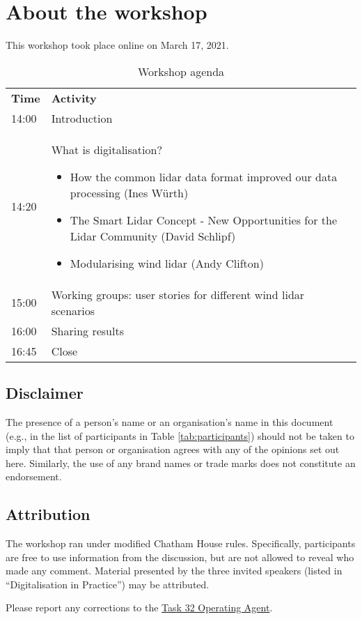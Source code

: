 \section{About the workshop}
This workshop took place online on March 17, 2021.

\begin{table}[!h]
 \centering
 \begin{tabular}{@{}|p{}|p{}|@{}}
 \rowcolor{Task32Blue2} \textbf{Time} & \textbf{Activity} \\
 14:00 & Introduction \\
 14:20 & What is digitalisation?
  \begin{itemize}
        \item How the common lidar data format improved our data processing (Ines Würth)
        \item The Smart Lidar Concept - New Opportunities for the Lidar Community (David Schlipf)
	\item Modularising wind lidar (Andy Clifton)
    \end{itemize} \\
 15:00 & Working groups: user stories for different wind lidar scenarios\\
 16:00 & Sharing results\\
 16:45 & Close \\
 \end{tabular}
 \caption{Workshop agenda}
 \label{tab:agenda}
\end{table}

\subsection*{Disclaimer}
The presence of a person’s name or an organisation's name in this document (e.g., in the list of participants in Table \ref{tab:participants}) should not be taken to imply that that person or organisation agrees with any of the opinions set out here. Similarly, the use of any brand names or trade marks does not constitute an endorsement.

\subsection*{Attribution}
The workshop ran under modified Chatham House rules. Specifically, participants are free to use information from the discussion, but are not allowed to reveal who made any comment. Material presented by the three invited speakers (listed in “Digitalisation in Practice”) may be attributed.

\begin{taskactions}
    Please report any corrections to the \href{mailto:ieawind.task32@ifb.uni-stuttgart.de}{Task 32 Operating Agent}.
\end{taskactions}